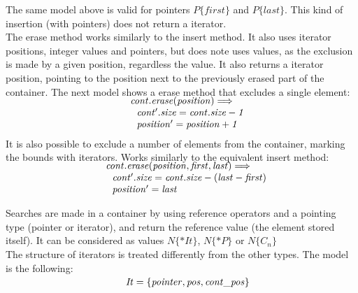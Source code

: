 \documentclass[a4paper]{llncs}
\begin{document}
	The same model above is valid for pointers $P\{first\}$ and $P\{last\}$. This kind of insertion (with pointers) does not return a iterator.
\\
%
	The erase method works similarly to the insert method. It also uses iterator positions, integer values and pointers, but does note uses values, as the exclusion is made by a given position, regardless the value. It also returns a iterator position, pointing to the position next to the previously erased part of the container. The next model shows a erase method that excludes a single element:\\
%

\[\begin{array}{r@{\:\:}c@{\:\:}l}\label{erase1-model}
\\[-5ex]
\
	& & \mathit{cont.erase} (\mathit{position}) \Longrightarrow\\
	&  & \: \: \:	\mathit{cont'.size} = \mathit{cont.size} - \mathit{1}\\
	&   & \: \: \:	\mathit{position'} = \mathit{position} + \mathit{1}\\
\end{array}
\]
	It is also possible to exclude a number of elements from the container, marking the bounds with iterators. Works similarly to the equivalent insert method:\\

\[\begin{array}{r@{\:\:}c@{\:\:}l}\label{erase2-model}
\\[-5ex]
	& &  \mathit{cont.erase} (\mathit{position}, \mathit{first}, \mathit{last}) \Longrightarrow\\
	&   & \: \: \:	\mathit{cont'.size} = \mathit{cont.size} -(\mathit{last} - \mathit{first})\\
	&   & \: \: \:	\mathit{position'} = \mathit{last}\\
\end{array}
\]

	Searches are made in a container by using reference operators and a pointing type (pointer or iterator), and return the reference value (the element stored itself). It can be considered as values $N\{*It\}$, $N\{*P\}$ or $N\{\mathit{C_n}\}$ \\

	The structure of iterators is treated differently from the other types. The model is the following:\\
	\[\begin{array}{r@{\:\:}c@{\:\:}l}\label{iterator1-model}
\\[-5ex]
 \ &  &\: \mathit{It} = \{ \mathit{pointer}, \mathit{pos}, \mathit{cont\_pos}\} \:\\
               
\end{array}
\]
	
\end{document}
